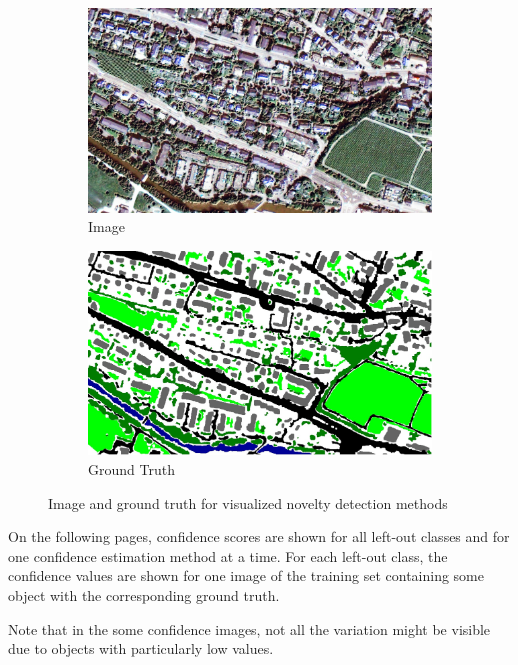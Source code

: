\documentclass[10pt]{article}
\begin{document}
\begin{figure}[H]
    \centering
    \begin{subfigure}{0.42\textwidth}
        \includegraphics[width=\textwidth]{Im_18}
        \caption{Image}
    \end{subfigure}
    \begin{subfigure}{0.42\textwidth}
        \includegraphics[width=\textwidth]{GT_18}
        \caption{Ground Truth}
    \end{subfigure}
    \caption{Image and ground truth for visualized novelty detection methods}
    \label{fig:app-im-gt-methods}
\end{figure}
On the following pages, confidence scores are shown for all left-out classes and for one confidence estimation method at a time. For each left-out class, the confidence values are shown for one image of the training set containing some object with the corresponding ground truth.

Note that in the some confidence images, not all the variation might be visible due to objects with particularly low values.
\end{document}
